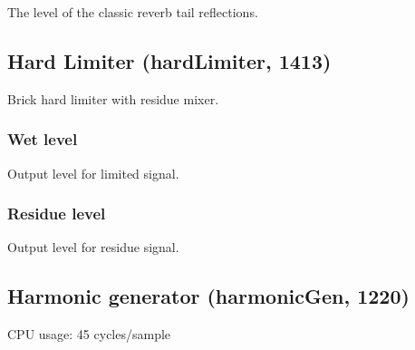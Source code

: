 \documentclass[11pt]{article}
\begin{document}
The level of the classic reverb tail reflections.\subsection{Hard Limiter (hardLimiter, 1413)\label{hardLimiter}\label{id1413}}
Brick hard limiter with residue mixer.\subsubsection*{Wet level}
Output level for limited signal.\subsubsection*{Residue level}
Output level for residue signal.\subsection{Harmonic generator (harmonicGen, 1220)\label{harmonicGen}\label{id1220}}
CPU usage: 45 cycles/sample
\end{document}
